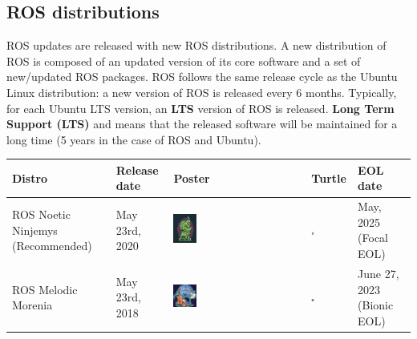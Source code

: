 \documentclass[../../main]{subfiles}
\begin{document}
\newpage
\subsection{ROS distributions}
ROS updates are released with new ROS distributions. A new distribution of ROS is composed of an updated version of its core software and a set of new/updated ROS packages. ROS follows the same release cycle as the Ubuntu Linux distribution: a new version of ROS is released every 6 months. Typically, for each Ubuntu LTS version, an \textbf{LTS} version of ROS is released. \textbf{Long Term Support (LTS)} and means that the released software will be maintained for a long time (5 years in the case of ROS and Ubuntu).

\begin{table}[h!]
\begin{tcolorbox}[
    colback=red!5!white,colframe=red!75!black,
    title={\textbf{Built-in Field Types for Message Definition}},
    fonttitle=\bfseries, coltitle=white, width=\linewidth
]
    \centering
    \renewcommand{\arraystretch}{1} %
    \begin{longtable}{|
        >{\centering\arraybackslash}m{2.5cm}|
        >{\centering\arraybackslash}m{2cm}|
        >{\centering\arraybackslash}m{3cm}|
        >{\centering\arraybackslash}m{1.5cm}|
        >{\centering\arraybackslash}m{3cm}|}
    \hline 
    \rowcolor{red!20}
    \textbf{Distro} & \textbf{Release date} & \textbf{Poster} & \textbf{Turtle} & \textbf{EOL date} \\
    \hline \midrule

    ROS Noetic Ninjemys (Recommended) & May 23rd, 2020 & 
    \includegraphics[width=0.18\textwidth]{img/noetic.png} & 
    \includegraphics[width=0.08\textwidth]{img/noetic_c.png} & 
    May, 2025 (Focal EOL) \\ \hline

    ROS Melodic Morenia & May 23rd, 2018 & 
    \includegraphics[width=0.18\textwidth]{img/melodic_with_bg.png} & 
    \includegraphics[width=0.08\textwidth]{img/melodic.png} & 
    June 27, 2023 (Bionic EOL) \\ \hline


\end{longtable}
\end{tcolorbox}
\end{table}
\end{document}
